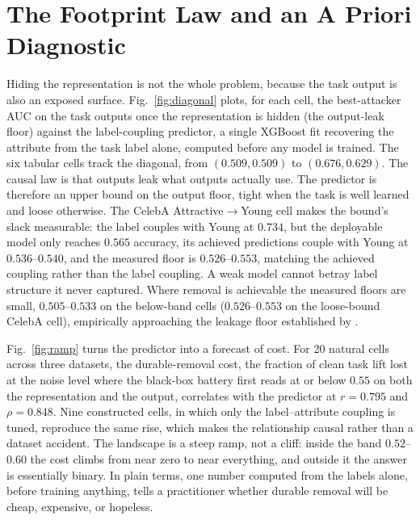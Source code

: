 \documentclass[letterpaper]{article} %
\begin{document}
\section{The Footprint Law and an A Priori Diagnostic}

Hiding the representation is not the whole problem, because the task
output is also an exposed surface. Fig.~\ref{fig:diagonal} plots, for
each cell, the best-attacker AUC on the task outputs once the
representation is hidden (the output-leak floor) against the
label-coupling predictor, a single XGBoost fit recovering the attribute
from the task label alone, computed before any model is trained. The six
tabular cells track the diagonal, from $(0.509, 0.509)$ to
$(0.676, 0.629)$. The causal law is that outputs leak what outputs
actually use. The predictor is therefore an upper bound on the output
floor, tight when the task is well learned and loose otherwise. The
CelebA Attractive$\to$Young cell makes the bound's slack measurable: the
label couples with Young at $0.734$, but the deployable model only
reaches $0.565$ accuracy, its achieved predictions couple with Young at
$0.536$--$0.540$, and the measured floor is $0.526$--$0.553$, matching
the achieved coupling rather than the label coupling. A weak model cannot
betray label structure it never captured. Where removal
is achievable the measured floors are small, $0.505$--$0.533$ on the
below-band cells ($0.526$--$0.553$ on the loose-bound CelebA cell),
empirically approaching the leakage floor established by
\citet{stadler2024}.

Fig.~\ref{fig:ramp} turns the predictor into a forecast of cost. For 20
natural cells across three datasets, the durable-removal cost, the
fraction of clean task lift lost at the noise level where the black-box
battery first reads at or below $0.55$ on both the representation and the
output, correlates with the predictor at $r = 0.795$ and
$\rho = 0.848$. Nine constructed cells, in which only the
label--attribute coupling is tuned, reproduce the same rise, which makes
the relationship causal rather than a dataset accident. The landscape is
a steep ramp, not a cliff: inside the band $0.52$--$0.60$ the cost climbs
from near zero to near everything, and outside it the answer is
essentially binary. In plain terms, one number computed from the labels
alone, before training anything, tells a practitioner whether durable
removal will be cheap, expensive, or hopeless.
\end{document}
